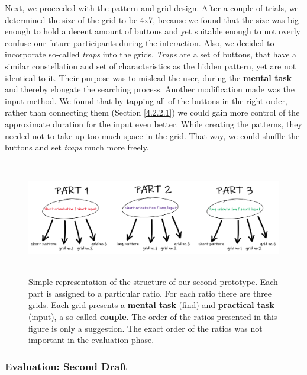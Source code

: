 Next, we proceeded with the pattern and grid design. After a couple of trials, we determined the size of the grid to be 4x7, because we found that the size was big enough to hold a decent amount of buttons and yet suitable enough to not overly confuse our future participants during the interaction. Also, we decided to incorporate so-called \textit{traps} into the grids. \textit{Traps} are a set of buttons, that have a similar constellation and set of characteristics as the hidden pattern, yet are not identical to it. Their purpose was to mislead the user, during the \textbf{mental task} and thereby elongate the searching process. Another modification made was the input method. We found that by tapping all of the buttons in the right order, rather than connecting them (Section \ref{4.2.2.1}) we could gain more control of the approximate duration for the input even better. While creating the patterns, they needed not to take up too much space in the grid. That way, we could shuffle the buttons and set \textit{traps} much more freely. 

\begin{figure}[t!]
\centering
\includegraphics[width=13cm, height=5cm]{Chapters/graphics/prototypeStructure.PNG}
\caption{Simple representation of the structure of our second prototype. Each part is assigned to a particular ratio. For each ratio there are three grids. Each grid presents a \textbf{mental task} (find) and \textbf{practical task} (input), a so called \textbf{couple}. The order of the ratios presented in this figure is only a suggestion. The exact order of the ratios was not important in the evaluation phase.}
\label{fig:prototype}
\end{figure}

\subsubsection{Evaluation: Second Draft} \label{4.2.2.4}

